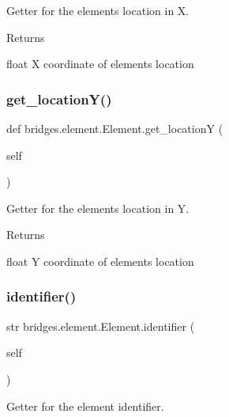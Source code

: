 Getter for the element\textquotesingle{}s location in X. 

\begin{DoxyReturn}{Returns}


float X coordinate of element\textquotesingle{}s location 
\end{DoxyReturn}
\mbox{\label{classbridges_1_1element_1_1_element_a108f62843d084beaf5fcf5fd202853c5}} 
\subsubsection{\texorpdfstring{get\_locationY()}{get\_locationY()}}
{\footnotesize\ttfamily def bridges.\+element.\+Element.\+get\+\_\+locationY (\begin{DoxyParamCaption}\item[{}]{self }\end{DoxyParamCaption})}



Getter for the element\textquotesingle{}s location in Y. 

\begin{DoxyReturn}{Returns}


float Y coordinate of element\textquotesingle{}s location 
\end{DoxyReturn}
\mbox{\label{classbridges_1_1element_1_1_element_a31cdf36f75fe34aebec85b95025cc732}} 
\subsubsection{\texorpdfstring{identifier()}{identifier()}\hspace{0.1cm}{\footnotesize\ttfamily [1/2]}}
{\footnotesize\ttfamily  str bridges.\+element.\+Element.\+identifier (\begin{DoxyParamCaption}\item[{}]{self }\end{DoxyParamCaption})}



Getter for the element identifier. 

